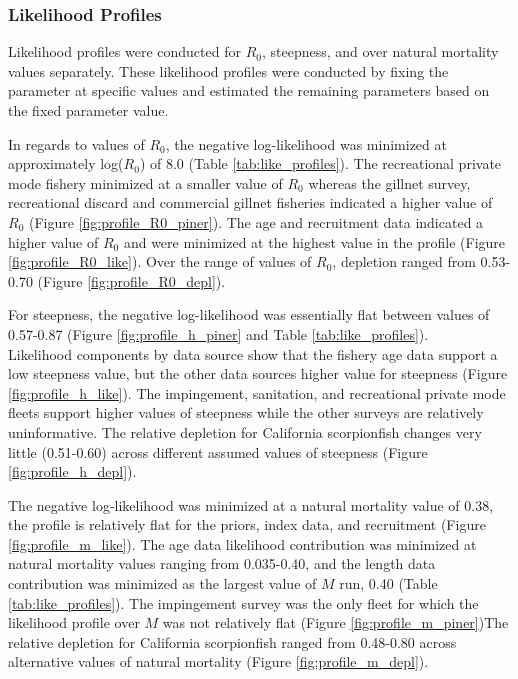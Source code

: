 \documentclass[12pt,]{article}
\begin{document}
\subsubsection{Likelihood Profiles}\label{likelihood-profiles}

Likelihood profiles were conducted for \(R_0\), steepness, and over
natural mortality values separately. These likelihood profiles were
conducted by fixing the parameter at specific values and estimated the
remaining parameters based on the fixed parameter value.

In regards to values of \(R_0\), the negative log-likelihood was
minimized at approximately log(\(R_0\)) of 8.0 (Table
\ref{tab:like_profiles}). The recreational private mode fishery
minimized at a smaller value of \(R_0\) whereas the gillnet survey,
recreational discard and commercial gillnet fisheries indicated a higher
value of \(R_0\) (Figure \ref{fig:profile_R0_piner}). The age and
recruitment data indicated a higher value of \(R_0\) and were minimized
at the highest value in the profile (Figure \ref{fig:profile_R0_like}).
Over the range of values of \(R_0\), depletion ranged from 0.53-0.70
(Figure \ref{fig:profile_R0_depl}).

For steepness, the negative log-likelihood was essentially flat between
values of 0.57-0.87 (Figure \ref{fig:profile_h_piner} and Table
\ref{tab:like_profiles}).\\
Likelihood components by data source show that the fishery age data
support a low steepness value, but the other data sources higher value
for steepness (Figure \ref{fig:profile_h_like}). The impingement,
sanitation, and recreational private mode fleets support higher values
of steepness while the other surveys are relatively uninformative. The
relative depletion for California scorpionfish changes very little
(0.51-0.60) across different assumed values of steepness (Figure
\ref{fig:profile_h_depl}).

The negative log-likelihood was minimized at a natural mortality value
of 0.38, the profile is relatively flat for the priors, index data, and
recruitment (Figure \ref{fig:profile_m_like}). The age data likelihood
contribution was minimized at natural mortality values ranging from
0.035-0.40, and the length data contribution was minimized as the
largest value of \(M\) run, 0.40 (Table \ref{tab:like_profiles}). The
impingement survey was the only fleet for which the likelihood profile
over \(M\) was not relatively flat (Figure \ref{fig:profile_m_piner})The
relative depletion for California scorpionfish ranged from 0.48-0.80
across alternative values of natural mortality (Figure
\ref{fig:profile_m_depl}).
\end{document}
